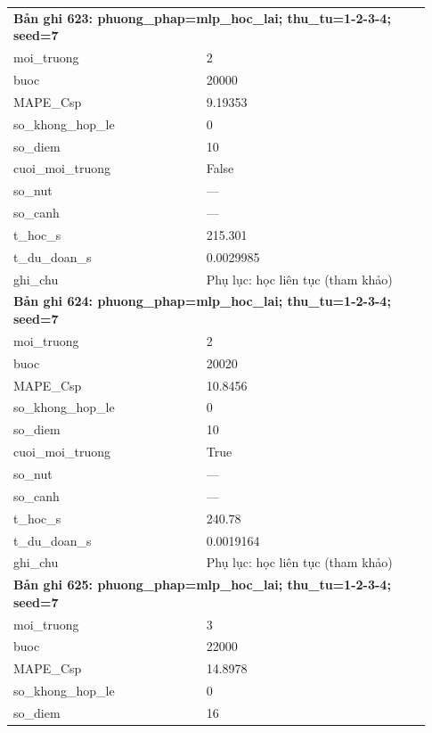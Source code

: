 \begin{longtable}{p{0.43\linewidth}p{0.50\linewidth}}
\midrule
\multicolumn{2}{p{0.95\linewidth}}{\textbf{Bản ghi 623: phuong\_phap=mlp\_hoc\_lai; thu\_tu=1-2-3-4; seed=7}} \\
moi\_\allowbreak truong & 2 \\
buoc & 20000 \\
MAPE\_\allowbreak Csp & 9.19353 \\
so\_\allowbreak khong\_\allowbreak hop\_\allowbreak le & 0 \\
so\_\allowbreak diem & 10 \\
cuoi\_\allowbreak moi\_\allowbreak truong & False \\
so\_\allowbreak nut & — \\
so\_\allowbreak canh & — \\
t\_\allowbreak hoc\_\allowbreak s & 215.301 \\
t\_\allowbreak du\_\allowbreak doan\_\allowbreak s & 0.0029985 \\
ghi\_\allowbreak chu & Phụ lục: học liên tục (tham khảo) \\
\midrule
\multicolumn{2}{p{0.95\linewidth}}{\textbf{Bản ghi 624: phuong\_phap=mlp\_hoc\_lai; thu\_tu=1-2-3-4; seed=7}} \\
moi\_\allowbreak truong & 2 \\
buoc & 20020 \\
MAPE\_\allowbreak Csp & 10.8456 \\
so\_\allowbreak khong\_\allowbreak hop\_\allowbreak le & 0 \\
so\_\allowbreak diem & 10 \\
cuoi\_\allowbreak moi\_\allowbreak truong & True \\
so\_\allowbreak nut & — \\
so\_\allowbreak canh & — \\
t\_\allowbreak hoc\_\allowbreak s & 240.78 \\
t\_\allowbreak du\_\allowbreak doan\_\allowbreak s & 0.0019164 \\
ghi\_\allowbreak chu & Phụ lục: học liên tục (tham khảo) \\
\midrule
\multicolumn{2}{p{0.95\linewidth}}{\textbf{Bản ghi 625: phuong\_phap=mlp\_hoc\_lai; thu\_tu=1-2-3-4; seed=7}} \\
moi\_\allowbreak truong & 3 \\
buoc & 22000 \\
MAPE\_\allowbreak Csp & 14.8978 \\
so\_\allowbreak khong\_\allowbreak hop\_\allowbreak le & 0 \\
so\_\allowbreak diem & 16 \\

\end{longtable}
